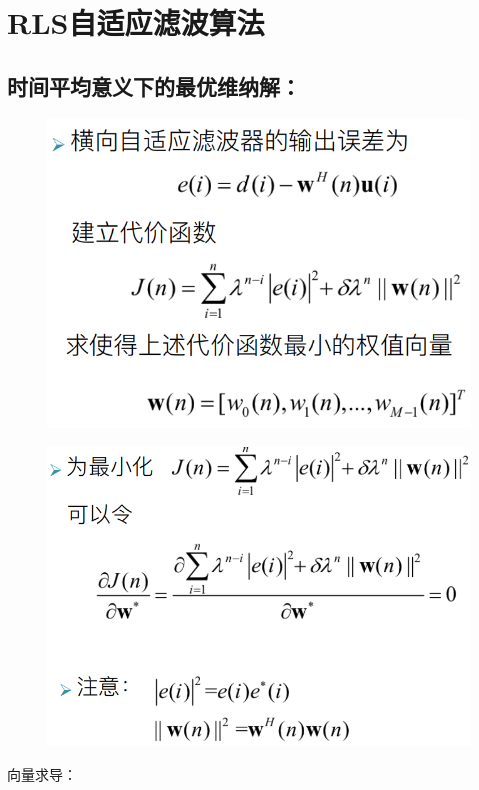 \documentclass[UTF8]{ctexart} %
\begin{document}
		\section{RLS自适应滤波算法}
			\subsection{时间平均意义下的最优维纳解：}
				\begin{figure}[H]
					\centering\includegraphics[scale=0.4]{51.png}
				\end{figure}
				\begin{figure}[H]
					\centering\includegraphics[scale=0.4]{52.png}
				\end{figure}
				向量求导：
\end{document}

